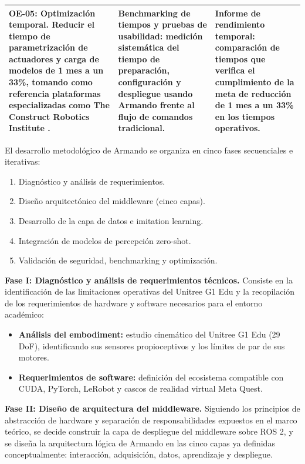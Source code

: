 \documentclass[stu,12pt,floatsintext]{apa7}
\begin{document}
\begin{longtable}{|p{3.6cm}|p{5.4cm}|p{5.4cm}|}
\textbf{OE-05: Optimización temporal.} Reducir el tiempo de parametrización de actuadores y carga de modelos de 1 mes a un 33\%, tomando como referencia plataformas especializadas como The Construct Robotics Institute \parencite{theconstruct2026humanoid}. &
\textbf{Benchmarking de tiempos y pruebas de usabilidad:} medición sistemática del tiempo de preparación, configuración y despliegue usando Armando frente al flujo de comandos tradicional. &
\textbf{Informe de rendimiento temporal:} comparación de tiempos que verifica el cumplimiento de la meta de reducción de 1 mes a un 33\% en los tiempos operativos. \\
\hline
\end{longtable}

El desarrollo metodológico de Armando se organiza en cinco fases secuenciales e iterativas:

\begin{enumerate}
    \item Diagnóstico y análisis de requerimientos.
    \item Diseño arquitectónico del middleware (cinco capas).
    \item Desarrollo de la capa de datos e imitation learning.
    \item Integración de modelos de percepción zero-shot.
    \item Validación de seguridad, benchmarking y optimización.
\end{enumerate}

\textbf{Fase I: Diagnóstico y análisis de requerimientos técnicos.} Consiste en la identificación de las limitaciones operativas del Unitree G1 Edu y la recopilación de los requerimientos de hardware y software necesarios para el entorno académico:
\begin{itemize}
    \item \textbf{Análisis del embodiment:} estudio cinemático del Unitree G1 Edu (29 DoF), identificando sus sensores propioceptivos y los límites de par de sus motores.
    \item \textbf{Requerimientos de software:} definición del ecosistema compatible con CUDA, PyTorch, LeRobot y cascos de realidad virtual Meta Quest.
\end{itemize}

\textbf{Fase II: Diseño de arquitectura del middleware.} Siguiendo los principios de abstracción de hardware y separación de responsabilidades expuestos en el marco teórico, se decide construir la capa de despliegue del middleware sobre ROS 2, y se diseña la arquitectura lógica de Armando en las cinco capas ya definidas conceptualmente: interacción, adquisición, datos, aprendizaje y despliegue.
\end{document}
